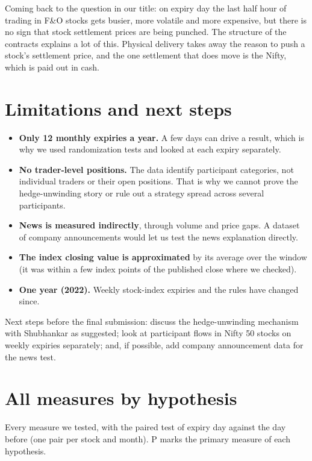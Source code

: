 \documentclass[11pt,a4paper]{article}
\begin{document}
Coming back to the question in our title: on expiry day the last half hour of trading in F\&O
stocks gets busier, more volatile and more expensive, but there is no sign that stock settlement
prices are being punched. The structure of the contracts explains a lot of this. Physical delivery
takes away the reason to push a stock's settlement price, and the one settlement that does move
is the Nifty, which is paid out in cash.

\section{Limitations and next steps}

\begin{itemize}
  \item \textbf{Only 12 monthly expiries a year.} A few days can drive a result, which is why we
  used randomization tests and looked at each expiry separately.
  \item \textbf{No trader-level positions.} The data identify participant categories, not
  individual traders or their open positions. That is why we cannot prove the hedge-unwinding
  story or rule out a strategy spread across several participants.
  \item \textbf{News is measured indirectly}, through volume and price gaps. A dataset of company
  announcements would let us test the news explanation directly.
  \item \textbf{The index closing value is approximated} by its average over the window (it was
  within a few index points of the published close where we checked).
  \item \textbf{One year (2022).} Weekly stock-index expiries and the rules have changed since.
\end{itemize}

Next steps before the final submission: discuss the hedge-unwinding mechanism with Shubhankar as
suggested; look at participant flows in Nifty 50 stocks on weekly expiries separately; and, if
possible, add company announcement data for the news test.

\appendix
\section{All measures by hypothesis}

Every measure we tested, with the paired test of expiry day against the day before (one pair per
stock and month). P marks the primary measure of each hypothesis.
\end{document}

